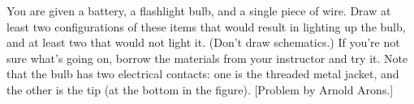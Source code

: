 You are given a battery, a flashlight bulb, and a single
        piece of wire.  Draw at least two configurations of these
        items that would result in lighting up the bulb, and at
        least two that would not light it.  (Don't draw schematics.)
         If you're not sure what's going on, borrow the materials
        from your instructor and try it. Note that the bulb has two
        electrical contacts: one is the threaded metal jacket, and
        the other is the tip (at the bottom in the figure). [Problem by Arnold Arons.]
